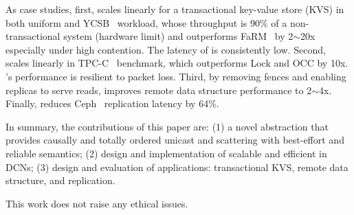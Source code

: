 As case studies, first, \sys{} scales linearly for a transactional key-value store (KVS) in both uniform and YCSB~\cite{cooper2010benchmarking} workload, whose throughput is 90\% of a non-transactional system (hardware limit) and outperforms FaRM~\cite{dragojevic2014farm} by 2$\sim$20x especially under high contention.
The latency of \sys{} is consistently low.
Second, \sys{} scales linearly in TPC-C~\cite{tpcc} benchmark, which outperforms Lock and OCC by 10x. \sys{}'s performance is resilient to packet loss.
Third, by removing fences and enabling replicas to serve reads, \sys{} improves remote data structure performance to 2$\sim$4x.
Finally, \sys{} reduces Ceph~\cite{weil2006ceph} replication latency by 64\%.

In summary, the contributions of this paper are: (1) a novel abstraction \sys{} that provides causally and totally ordered unicast and scattering with best-effort and reliable semantics; (2) design and implementation of scalable and efficient \sys{} in DCNs; (3) design and evaluation of \sys{} applications: transactional KVS,  remote data structure, and replication.

This work does not raise any ethical issues.


